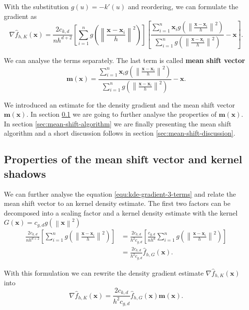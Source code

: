 \documentclass{article}
\newcommand{\norm}[1]{\left\lVert#1\right\rVert}
\begin{document}
With the substitution $g(u) = -k'(u)$ and reordering, we can formulate the gradient as
\begin{equation}
	\nabla \hat{f}_{h,K}(\bm{x}) = \frac{2c_{k,d}}{nh^{d+2}} \left[\sum_{i=1}^n g\left(\norm{\frac{\bm{x} - \bm{x}_i}{h}}^2 \right)\right] \left[\frac{\sum_{i=1}^n \bm{x}_i g\left(\norm{\frac{\bm{x} - \bm{x}_i}{h}}^2 \right)}{\sum_{i=1}^n g\left(\norm{\frac{\bm{x} - \bm{x}_i}{h}}^2 \right)} - \bm{x}\right]\text{.}
	\label{equ:kde-gradient-3-terms}
\end{equation}

We can analyse the terms separately. The last term is called \textbf{mean shift vector}
\begin{equation}
	\bm{m}(\bm{x}) = \frac{\sum_{i=1}^n \bm{x}_i g\left(\norm{\frac{\bm{x} - \bm{x}_i}{h}}^2 \right)}{\sum_{i=1}^n g\left(\norm{\frac{\bm{x} - \bm{x}_i}{h}}^2 \right)} - \bm{x}\text{.}
\end{equation}

We introduced an estimate for the density gradient and the mean shift vector $\bm{m}(\bm{x})$. In section \ref{sec:mean-shift-vector-properties} we are going to further analyse the properties of $\bm{m}(\bm{x})$. In section \ref{sec:mean-shift-algorithm} we are finally presenting the mean shift algorithm and a short discussion follows in section \ref{sec:mean-shift-discussion}.


\subsection{Properties of the mean shift vector and kernel shadows} \label{sec:mean-shift-vector-properties}

We can further analyse the equation \ref{equ:kde-gradient-3-terms} and relate the mean shift vector to an kernel density estimate. The first two factors can be decomposed into a scaling factor and a kernel density estimate with the kernel $G(\bm{x}) = c_{g,d} g(\norm{\bm{x}}^2)$
\begin{align}
	\frac{2c_{k,d}}{nh^{d+2}} \left[\sum_{i=1}^n g\left(\norm{\frac{\bm{x} - \bm{x}_i}{h}}^2 \right)\right] &= \frac{2c_{k,d}}{h^2c_{g,d}} \left[\frac{c_{g,d}}{nh^d} \sum_{i=1}^n g\left(\norm{\frac{\bm{x} - \bm{x}_i}{h}}^2 \right) \right]\\
	&= \frac{2c_{k,d}}{h^2c_{g,d}} \hat{f}_{h,G}(\bm{x})\text{.}
\end{align}

With this formulation we can rewrite the density gradient estimate $\nabla \hat{f}_{h,K}(\bm{x})$ into
\begin{equation}
	\nabla \hat{f}_{h,K}(\bm{x}) = \frac{2c_{k,d}}{h^2c_{g,d}} \hat{f}_{h,G}(\bm{x}) \bm{m}(\bm{x})\text{.}
\end{equation}
\end{document}
